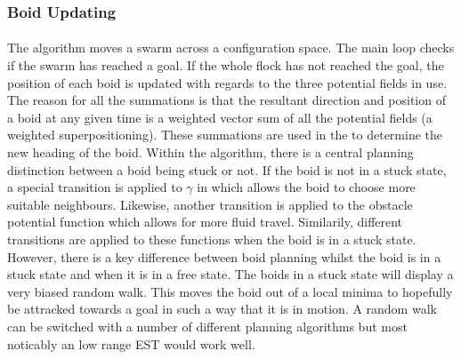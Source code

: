 \documentclass[12pt]{article}
\begin{document}
\subsubsection{Boid Updating}
\paragraph{} The algorithm moves a swarm across a configuration space. The main loop checks if the swarm has reached a goal. If the whole flock has not reached the goal, the position of each boid is updated with regards to the three potential fields in use. The reason for all the summations is that the resultant direction and position of a boid at any given time is a weighted vector sum of all the potential fields (a weighted superpositioning). These summations are used in the to determine the new heading of the boid. Within the algorithm, there is a central planning distinction between a boid being stuck or not. If the boid is not in a stuck state, a special transition is applied to \(\gamma\) in which allows the boid to choose more suitable neighbours. Likewise, another transition is applied to the obstacle potential function which allows for more fluid travel. Similarily, different transitions are applied to these functions when the boid is in a stuck state. However, there is a key difference between boid planning whilst the boid is in a stuck state and when it is in a free state. The boids in a stuck state will display a very biased random walk. This moves the boid out of a local minima to hopefully be attracked towards a goal in such a way that it is in motion. A random walk can be switched with a number of different planning algorithms but most noticably an low range EST would work well.
\end{document}
